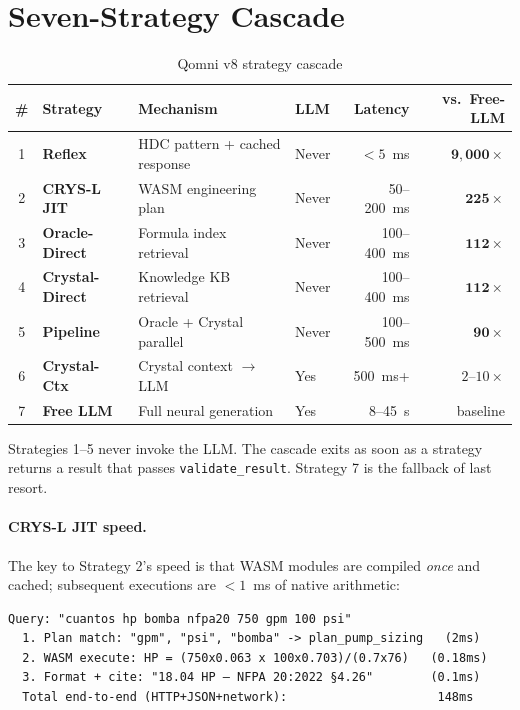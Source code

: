 \documentclass[12pt,a4paper]{article}
\begin{document}
\section{Seven-Strategy Cascade}
\label{sec:cascade}

\begin{table}[h]
\centering
\caption{Qomni v8 strategy cascade}
\label{tab:cascade}
\begin{tabular}{clllrr}
\toprule
\# & Strategy & Mechanism & LLM & Latency & vs.\ Free-LLM \\
\midrule
1 & \textbf{Reflex} & HDC pattern + cached response & Never & $<5$~ms & $\mathbf{9{,}000\times}$ \\
2 & \textbf{CRYS-L JIT} & WASM engineering plan & Never & 50--200~ms & $\mathbf{225\times}$ \\
3 & \textbf{Oracle-Direct} & Formula index retrieval & Never & 100--400~ms & $\mathbf{112\times}$ \\
4 & \textbf{Crystal-Direct} & Knowledge KB retrieval & Never & 100--400~ms & $\mathbf{112\times}$ \\
5 & \textbf{Pipeline} & Oracle + Crystal parallel & Never & 100--500~ms & $\mathbf{90\times}$ \\
6 & \textbf{Crystal-Ctx} & Crystal context $\to$ LLM & Yes & 500~ms+ & $2\text{--}10\times$ \\
7 & \textbf{Free LLM} & Full neural generation & Yes & 8--45~s & baseline \\
\bottomrule
\end{tabular}
\end{table}

Strategies 1--5 never invoke the LLM. The cascade exits as soon as a strategy
returns a result that passes \texttt{validate\_result}. Strategy 7 is the
fallback of last resort.

\paragraph{CRYS-L JIT speed.}
The key to Strategy 2's speed is that WASM modules are compiled \emph{once}
and cached; subsequent executions are $<1$~ms of native arithmetic:

\begin{verbatim}
Query: "cuantos hp bomba nfpa20 750 gpm 100 psi"
  1. Plan match: "gpm", "psi", "bomba" -> plan_pump_sizing   (2ms)
  2. WASM execute: HP = (750x0.063 x 100x0.703)/(0.7x76)   (0.18ms)
  3. Format + cite: "18.04 HP — NFPA 20:2022 §4.26"        (0.1ms)
  Total end-to-end (HTTP+JSON+network):                     148ms
\end{verbatim}
\end{document}
